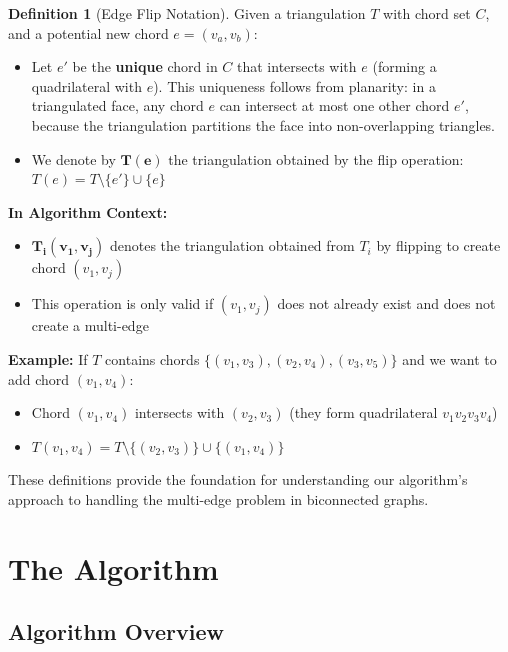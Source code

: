 \documentclass[12pt,a4paper]{article}
\theoremstyle{definition}
\newtheorem{definition}{Definition}
\theoremstyle{remark}
\begin{document}
\begin{definition}[Edge Flip Notation]
\label{def:edgeflip}
Given a triangulation $T$ with chord set $C$, and a potential new chord $e = (v_a, v_b)$:
\begin{itemize}
    \item Let $e'$ be the \textbf{unique} chord in $C$ that intersects with $e$ (forming a quadrilateral with $e$). This uniqueness follows from planarity: in a triangulated face, any chord $e$ can intersect at most one other chord $e'$, because the triangulation partitions the face into non-overlapping triangles.
    \item We denote by $\mathbf{T(e)}$ the triangulation obtained by the flip operation: $T(e) = T \setminus \{e'\} \cup \{e\}$
\end{itemize}

\textbf{In Algorithm Context:}
\begin{itemize}
    \item $\mathbf{T_i(v_1, v_j)}$ denotes the triangulation obtained from $T_i$ by flipping to create chord $(v_1, v_j)$
    \item This operation is only valid if $(v_1, v_j)$ does not already exist and does not create a multi-edge
\end{itemize}

\textbf{Example:} If $T$ contains chords $\{(v_1,v_3), (v_2,v_4), (v_3,v_5)\}$ and we want to add chord $(v_1,v_4)$:
\begin{itemize}
    \item Chord $(v_1,v_4)$ intersects with $(v_2,v_3)$ (they form quadrilateral $v_1v_2v_3v_4$)
    \item $T(v_1,v_4) = T \setminus \{(v_2,v_3)\} \cup \{(v_1,v_4)\}$
\end{itemize}
\end{definition}

These definitions provide the foundation for understanding our algorithm's approach to handling the multi-edge problem in biconnected graphs.


\section{The Algorithm}

\label{sec:algorithm}

\subsection{Algorithm Overview}
\end{document}
